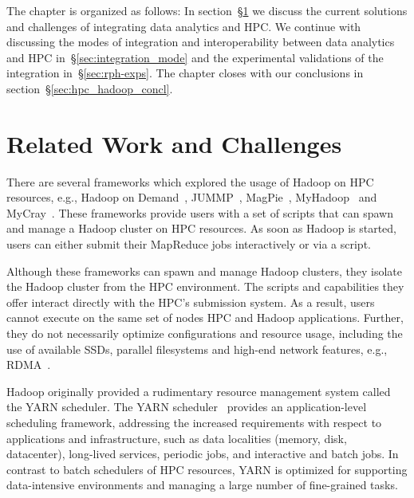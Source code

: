 The chapter is organized as follows: In section~\S\ref{sec:hpc_hadoop_rel} we
discuss the current solutions and challenges of integrating data analytics and
HPC. We continue with discussing the modes of integration and interoperability
between data analytics and HPC in~\S\ref{sec:integration_mode} and the
experimental validations of the integration in~\S\ref{sec:rph-exps}. The chapter
closes with our conclusions in section~\S\ref{sec:hpc_hadoop_concl}.


\section{Related Work and Challenges}
\label{sec:hpc_hadoop_rel}

There are several frameworks which explored the usage of Hadoop on HPC
resources, e.g., Hadoop on Demand~\cite{hod}, JUMMP~\cite{moody2013jummp},
MagPie~\cite{chu2015magpie}, MyHadoop~\cite{krishnan2011myhadoop} and
MyCray~\cite{mycray}. These frameworks provide users with a set of scripts that
can spawn and manage a Hadoop cluster on HPC resources. As soon as Hadoop is
started, users can either submit their MapReduce jobs interactively or via a
script.

Although these frameworks can spawn and manage Hadoop clusters, they isolate the
Hadoop cluster from the HPC environment. The scripts and capabilities they offer
interact directly with the HPC's submission system. As a result, users cannot
execute on the same set of nodes HPC and Hadoop applications. Further, they do
not necessarily optimize configurations and resource usage, including the use of
available SSDs, parallel filesystems and high-end network features, e.g.,
RDMA~\cite{rahman2014homr}.

Hadoop originally provided a rudimentary resource management system called the
YARN scheduler. The YARN scheduler~\cite{vavilapalli2013apache} provides an
application-level scheduling framework, addressing the increased requirements
with respect to applications and infrastructure, such as data localities
(memory, disk, datacenter), long-lived services, periodic jobs, and interactive
and batch jobs. In contrast to batch schedulers of HPC resources, YARN is
optimized for supporting data-intensive environments and managing a large number
of fine-grained tasks.


